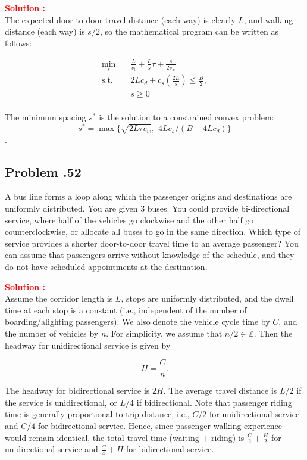 \documentclass[12pt]{article}
\newcommand{\customsubsection}[1]{
  \subsection*{Problem \thesection.#1}
}
\begin{document}
\textbf{\textcolor{red}{Solution :}} \\
%
%
The expected door-to-door travel distance (each way) is clearly \(L\), and walking distance (each way) is \(s/2\), so the mathematical program can be written as follows:


\begin{equation*}
\begin{aligned}
\min_{s} \quad & \frac{L}{v_t} + \frac{L}{s}\tau + \frac{s}{2v_w} \\
\textrm{s.t.} \quad &  2L c_d + c_s \left( \frac{2L}{s} \right) \leq \frac{B}{2},\\
  & s \geq 0    \\
\end{aligned}
\end{equation*}

The minimum spacing \(s^\ast\) is the solution to a constrained convex problem: \[ s^\ast = \max \{\sqrt{2L\tau v_w}, \,\, 4Lc_s/(B-4L c_d) \}\].

   
\newpage

\customsubsection{52}
A bus line forms a loop along which the passenger origins and destinations are uniformly distributed. You are given 3 buses. You could provide bi-directional service, where half of the vehicles go clockwise and the other half go counterclockwise, or allocate all buses to go in the same direction. Which type of service provides a shorter door-to-door travel time to an average passenger? You can assume that passengers arrive without knowledge of the schedule, and they do not have scheduled appointments at the destination.

\textbf{\textcolor{red}{Solution :}} \\
Assume the corridor length is \(L\), stops are uniformly distributed, and the dwell time at each stop is a constant (i.e., independent of the number of boarding/alighting passengers). We also denote the vehicle cycle time by \(C\), and the number of vehicles by \(n\). For simplicity, we assume that \(n/2 \in \mathbb{Z}\). Then the headway for unidirectional service is given by 

\[
H = \frac{C}{n}.
\]

The headway for bidirectional service is \(2H\). The average travel distance is \(L/2\) if the service is unidirectional, or \(L/4\) if bidirectional. Note that passenger riding time is generally proportional to trip distance, i.e., \(C/2\) for unidirectional service and \(C/4\) for bidirectional service. Hence, since passenger walking experience would remain identical, the total travel time (waiting + riding) is \(\frac{C}{2} + \frac{H}{2}\) for unidirectional service and \(\frac{C}{4} + H\) for bidirectional service.
\end{document}
